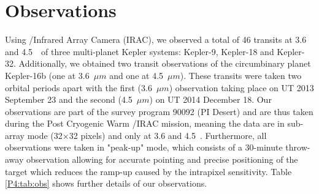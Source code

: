 \section{Observations}
\label{P4:sec:obs}

Using \spitzer/Infrared Array Camera (IRAC), we observed a total of 46 transits at 3.6 and 4.5~\um~of three multi-planet Kepler systems: Kepler-9, Kepler-18 and Kepler-32. Additionally, we obtained two transit observations of the circumbinary planet Kepler-16b (one at 3.6~$\mu m$ and one at 4.5~$\mu m$). These transits were taken two orbital periods apart with the first (3.6~$\mu m$) observation taking place on UT 2013 September 23 and the second (4.5~$\mu m$) on UT 2014 December 18. Our observations are part of the survey program 90092 (PI Desert) and are thus taken during the Post Cryogenic Warm \spitzer/IRAC mission, meaning the data are in sub-array mode (32$\times$32 pixels) and only at 3.6 and 4.5~\um. Furthermore, all observations were taken in "peak-up" mode, which consists of a 30-minute throw-away observation allowing for accurate pointing and precise positioning of the target which reduces the ramp-up caused by the intrapixel sensitivity. Table \ref{P4:tab:obs} shows further details of our observations.


